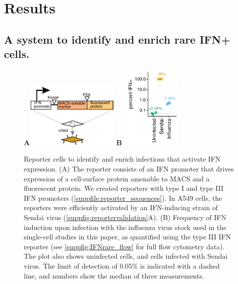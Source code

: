 \documentclass[lineno]{asm-article}
\newcommand{\SUPPFILE}[1]{\autoref{suppfile:#1}}
\newcommand{\SUPPFIG}[1]{\autoref{suppfig:#1}}
\begin{document}
\section{Results}

\subsection{A system to identify and enrich rare IFN+ cells.}

\begin{figure}
\centerline{
{\bf \Large A}\includegraphics[width=0.4\textwidth,valign=t]{figures/IFN_stochastic/IFN_reporter/IFN_reporter.pdf}
\hspace{0.03\textwidth}
{\bf \Large B} \includegraphics[width=0.26\textwidth,valign=t]{figures/IFN_stochastic/Flow/ifn_percent.pdf}
}
\caption{
Reporter cells to identify and enrich infections that activate IFN expression.
(A) The reporter consists of an IFN promoter that drives expression of a cell-surface protein amenable to MACS and a fluorescent protein.
We created reporters with type I and type III IFN promoters (\SUPPFILE{reporter_sequences}).
In A549 cells, the reporters were efficiently activated by an IFN-inducing strain of Sendai virus (\SUPPFIG{reportervalidation}A).
(B)
Frequency of IFN induction upon infection with the influenza virus stock used in the single-cell studies in this paper, as quantified using the type III IFN reporter (see \SUPPFIG{IFNrare_flow} for full flow cytometry data).
The plot also shows uninfected cells, and cells infected with Sendai virus.
The limit of detection of 0.05\% is indicated with a dashed line, and numbers show the median of three measurements.
}
\label{fig:IFNrare}
\end{figure}
\end{document}
